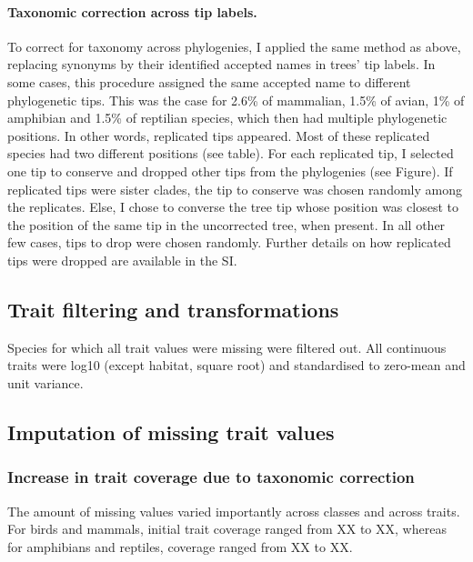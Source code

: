 \paragraph{Taxonomic correction across tip labels.} 
To correct for taxonomy across phylogenies, I applied the same method as above, replacing synonyms by their identified accepted names in trees' tip labels. In some cases, this procedure assigned the same accepted name to different phylogenetic tips. This was the case for 2.6\% of mammalian, 1.5\% of avian, 1\% of amphibian and  1.5\% of reptilian species, which then had multiple phylogenetic positions. In other words, replicated tips appeared. Most of these replicated species had two different positions (see table). For each replicated tip, I selected one tip to conserve and dropped other tips from the phylogenies (see Figure). If replicated tips were sister clades, the tip to conserve was chosen randomly among the replicates. Else, I chose to converse the tree tip whose position was closest to the position of the same tip in the uncorrected tree, when present. In all other few cases, tips to drop were chosen randomly. Further details on how replicated tips were dropped are available in the SI.

\subsection{Trait filtering and transformations}
Species for which all trait values were missing were filtered out. All continuous traits were log10 (except habitat, square root) and standardised to zero-mean and unit variance.


\subsection{Imputation of missing trait values}

\subsubsection{Increase in trait coverage due to taxonomic correction}
The amount of missing values varied importantly across classes and across traits. For birds and mammals, initial trait coverage ranged from XX to XX, whereas for amphibians and reptiles, coverage ranged from XX to XX. 

